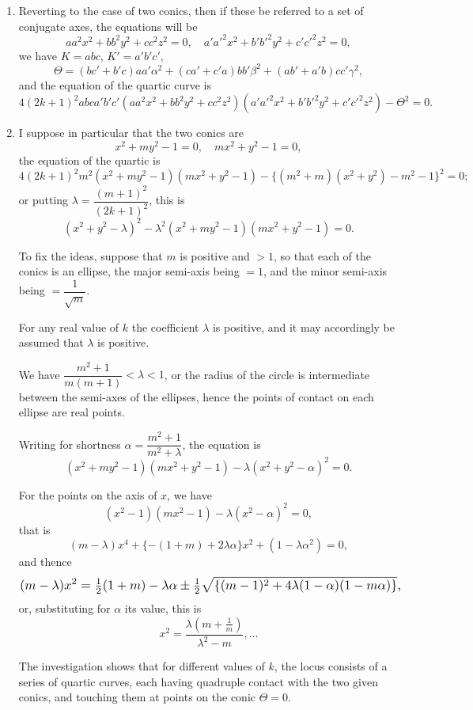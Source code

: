 \documentclass[12pt,a4paper]{article}
\theoremstyle{plain}
\theoremstyle{definition}
\theoremstyle{remark}
\begin{document}
\begin{enumerate}[label=\arabic*.]
\item Reverting to the case of two conics, then if these be referred to a set of conjugate axes, the equations will be
\[aa^2x^2 + bb^2y^2 + cc^2z^2 = 0, \quad a'a'^2x^2 + b'b'^2y^2 + c'c'^2z^2 = 0,\]
we have $K = abc$, $K' = a'b'c'$,
\[\Theta = (bc' + b'c)aa'\alpha^2 + (ca' + c'a)bb'\beta^2 + (ab' + a'b)cc'\gamma^2,\]
and the equation of the quartic curve is
\[4(2k+1)^2 abc a'b'c' (aa^2x^2 + bb^2y^2 + cc^2z^2)(a'a'^2x^2 + b'b'^2y^2 + c'c'^2z^2) - \Theta^2 = 0.\]

\item I suppose in particular that the two conics are
\[x^2 + my^2 - 1 = 0, \quad mx^2 + y^2 - 1 = 0,\]
the equation of the quartic is
\[4(2k+1)^2 m^2 (x^2 + my^2 - 1)(mx^2 + y^2 - 1) - \{(m^2 + m)(x^2 + y^2) - m^2 - 1\}^2 = 0;\]
or putting $\lambda = \dfrac{(m+1)^2}{(2k+1)^2}$, this is
\[(x^2 + y^2 - \lambda)^2 - \lambda^2(x^2 + my^2 - 1)(mx^2 + y^2 - 1) = 0.\]

To fix the ideas, suppose that $m$ is positive and $> 1$, so that each of the conics is an ellipse, the major semi-axis being $= 1$, and the minor semi-axis being $= \dfrac{1}{\sqrt{m}}$.

For any real value of $k$ the coefficient $\lambda$ is positive, and it may accordingly be assumed that $\lambda$ is positive.

We have $\dfrac{m^2 + 1}{m(m+1)} < \lambda < 1$, or the radius of the circle is intermediate between the semi-axes of the ellipses, hence the points of contact on each ellipse are real points.

Writing for shortness $\alpha = \dfrac{m^2 + 1}{m^2 + \lambda}$, the equation is
\[(x^2 + my^2 - 1)(mx^2 + y^2 - 1) - \lambda(x^2 + y^2 - \alpha)^2 = 0.\]

For the points on the axis of $x$, we have
\[(x^2 - 1)(mx^2 - 1) - \lambda(x^2 - \alpha)^2 = 0,\]
that is
\[(m - \lambda)x^4 + \{-(1+m) + 2\lambda\alpha\}x^2 + (1 - \lambda\alpha^2) = 0,\]
and thence
\[
\resizebox{\textwidth}{!}{$\displaystyle (m - \lambda)x^2 = \tfrac{1}{2}(1 + m) - \lambda\alpha \pm \tfrac{1}{2}\sqrt{\{(m-1)^2 + 4\lambda(1-\alpha)(1-m\alpha)\}}, $}
\]
or, substituting for $\alpha$ its value, this is
\[x^2 = \frac{\lambda(m + \tfrac{1}{m})}{\lambda^2 - m}, \ldots\]

The investigation shows that for different values of $k$, the locus consists of a series of quartic curves, each having quadruple contact with the two given conics, and touching them at points on the conic $\Theta = 0$.
\end{enumerate}
\end{document}
